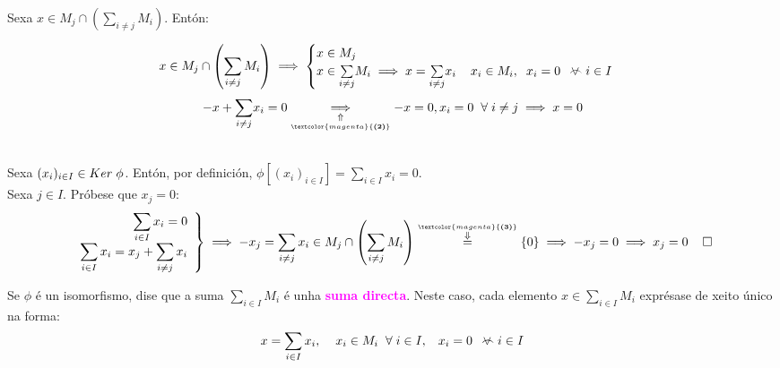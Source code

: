 \documentclass[twoside]{report}
\newcommand{\magbf}[1]{\textcolor{magenta}{\textbf{#1}}} %
\newcommand{\almostall}{\mathrel{\vee\mkern-19mu\frown}} %
\theoremstyle{mystyle}
\begin{document}
\noindent Sexa $x \in M_{j} \cap \left(\displaystyle \sum_{i \neq j} M_{i}\right)$. Entón:

$$
x \in M_{j} \cap \left(\displaystyle \sum_{i \neq j} M_{i}\right) \implies 
\begin{cases}
x \in M_{j}\\
x \in \underset{i \neq j}{\sum} M_{i} \implies x = \underset{i \neq j}{\sum}x_{i} \hspace{4mm} x_{i} \in M_{i}, \hspace{2mm} x_{i} = 0 \hspace{2mm} \almostall i \in I
\end{cases}
$$
\vspace{2mm}
$$
-x + \underset{i \neq j}{\sum}x_{i} = 0 \underset{\underset{\magbf{(2)}}{\Uparrow}}{\implies} -x = 0, x_{i} = 0 \hspace{2mm} \forall \hspace{1mm} i \neq j \implies x = 0
$$

\noindent {}\\

\noindent Sexa $(x_{i})_{i \in I} \in Ker \hspace{1mm} \phi$. Entón, por definición, $\phi[(x_{i})_{i \in I}] = \displaystyle \sum_{i \in I} x_{i} = 0$.\\

\noindent Sexa $j \in I$. Próbese que $x_{j} = 0$:
    \[ 
    \left. \begin{array}{r} 
    \displaystyle \sum_{i \in I} x_{i} = 0 \\[1ex]
    \displaystyle \sum_{i \in I} x_{i} = x_{j} + \displaystyle \sum_{i \neq j} x_{i}
    \end{array} \right\} 
    \implies -x_{j} = \displaystyle \sum_{i \neq j} x_{i} \in M_{j} \cap \left(\displaystyle \sum_{i \neq j} M_{i}\right) \overset{\overset{\magbf{(3)}}{\Downarrow}}{=} \{0\} \implies -x_{j} = 0 \implies x_{j} = 0 \hspace{4mm} \square
    \]
    
\vspace{3mm}

\noindent Se $\phi$ é un isomorfismo, dise que a suma $\displaystyle \sum_{i \in I} M_{i}$ é unha \magbf{suma directa}. Neste caso, cada elemento $x \in \underset{i \in I}{\sum}M_{i}$ exprésase de xeito único na forma:
$$x = \displaystyle \sum_{i \in I} x_{i}, \hspace{4mm} x_{i} \in M_{i} \hspace{2mm} \forall \hspace{1mm} i \in I, \hspace{3mm} x_{i} = 0 \hspace{2mm} \almostall i \in I$$
\end{document}

